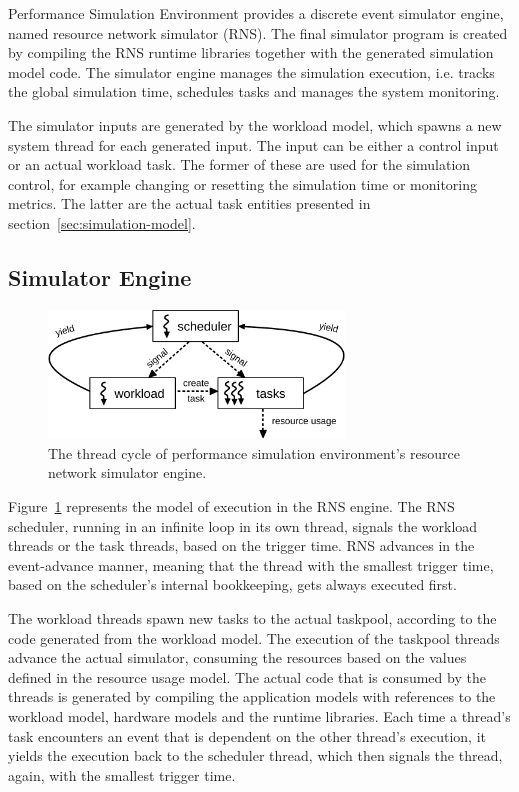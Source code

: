 Performance Simulation Environment provides a discrete event simulator engine, named resource network simulator (RNS). The final simulator program is created by compiling the RNS runtime libraries together with the generated simulation model code. The simulator engine manages the simulation execution, i.e. tracks the global simulation time, schedules tasks and manages the system monitoring.

The simulator inputs are generated by the workload model, which spawns a new system thread for each generated input. The input can be either a control input or an actual workload task. The former of these are used for the simulation control, for example changing or resetting the simulation time or monitoring metrics. The latter are the actual task entities presented in section~\ref{sec:simulation-model}.

\subsection{Simulator Engine}
\label{sec:simulator-engine}

\begin{figure}[]
  \begin{center}
    \includegraphics[width=0.7\textwidth]{images/rns-threads.pdf}
    \caption{The thread cycle of performance simulation environment's resource network simulator engine.}
    \label{fig:rns-threads}
  \end{center}
\end{figure}

Figure~\ref{fig:rns-threads} represents the model of execution in the RNS engine. The RNS scheduler, running in an infinite loop in its own thread, signals the workload threads or the task threads, based on the trigger time. RNS advances in the event-advance manner, meaning that the thread with the smallest trigger time, based on the scheduler's internal bookkeeping, gets always executed first.

The workload threads spawn new tasks to the actual taskpool, according to the code generated from the workload model. The execution of the taskpool threads advance the actual simulator, consuming the resources based on the values defined in the resource usage model. The actual code that is consumed by the threads is generated by compiling the application models with references to the workload model, hardware models and the runtime libraries. Each time a thread's task encounters an event that is dependent on the other thread's execution, it yields the execution back to the scheduler thread, which then signals the thread, again, with the smallest trigger time.

